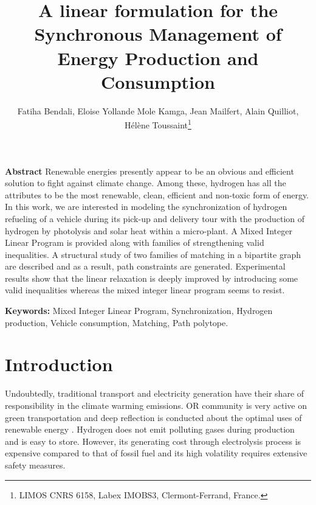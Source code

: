 \documentclass[11pt]{article}
\title{ \bf {A linear formulation for the Synchronous Management of Energy Production and Consumption}}
\author{Fatiha Bendali, Eloise Yollande Mole Kamga, Jean Mailfert, Alain Quilliot, Hélène Toussaint\footnote{LIMOS CNRS 6158, Labex IMOBS3, Clermont-Ferrand, France. }}
\date{}
\theoremstyle{plain}%
\theoremstyle{definition} \newtheorem{lem}{Lemma}[section]
\theoremstyle{definition} \newtheorem{claim}{Claim}[lem]
\theoremstyle{definition} \newtheorem{theorem}{Theorem}[section]
\theoremstyle{definition} \newtheorem{exo}{Exercice n$^\circ$}
\theoremstyle{definition} \newtheorem{quest}{}[exo]
\theoremstyle{definition} \newtheorem{sousquest}{}[quest]
\theoremstyle{remark}
\theoremstyle{definition}
\begin{document}
\maketitle
\thispagestyle{fancy}
%
{\bf Abstract}
Renewable energies presently appear to be an obvious and efficient solution to fight against climate change. Among these, hydrogen has all the attributes to be the most renewable, clean, efficient and non-toxic form of energy. In this work, we are interested in modeling the synchronization of hydrogen refueling of a vehicle during its pick-up and delivery tour with the production of hydrogen by photolysis and solar heat within a micro-plant. A Mixed Integer Linear Program is provided along with families of strengthening valid inequalities.  A structural study of two families of matching in a bipartite graph are described and as a result,  path constraints are generated. Experimental results show that the linear relaxation is deeply improved by introducing some valid inequalities whereas the mixed integer linear program seems to resist.
  
{\bf Keywords:} Mixed Integer Linear Program, Synchronization, Hydrogen production, Vehicle consumption, Matching, Path polytope. 
\section{ Introduction}\label{sec1}
Undoubtedly, traditional transport and electricity generation have their share of responsibility in
the climate warming emissions.
OR community is very active on green transportation and deep reflection is conducted about
the optimal uses of renewable energy  \cite{Dekk,Deza,Erdo,Ray}.
Hydrogen does not emit polluting gases during production and is easy to store. However,
its generating cost through electrolysis process is expensive compared to that of fossil fuel
and its high volatility requires extensive safety measures.
\end{document}
